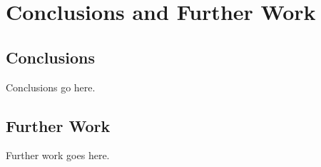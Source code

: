 \chapter{Conclusions and Further Work}
\label{cha:conclusions}

\minitoc
\vspace{10mm}

\section{Conclusions} %
\label{sec:conclusions_conclusions}
Conclusions go here.

\section{Further Work} %
\label{sec:further_work_conclusions}
Further work goes here.
